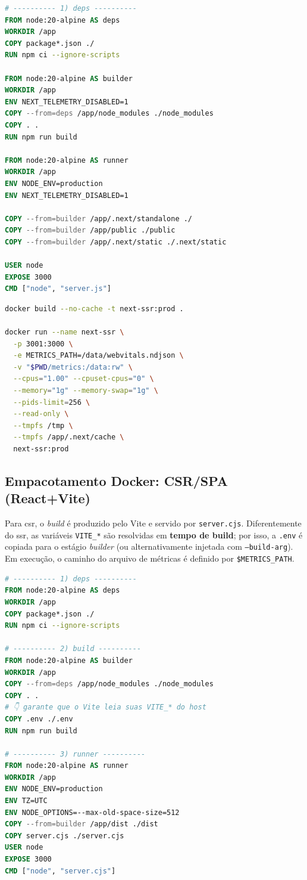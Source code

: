 \begin{lstlisting}[language=Dockerfile,caption={Dockerfile da aplicação SSR/MPA (Next.js)}]
# ---------- 1) deps ----------
FROM node:20-alpine AS deps
WORKDIR /app
COPY package*.json ./
RUN npm ci --ignore-scripts

FROM node:20-alpine AS builder
WORKDIR /app
ENV NEXT_TELEMETRY_DISABLED=1
COPY --from=deps /app/node_modules ./node_modules
COPY . .
RUN npm run build

FROM node:20-alpine AS runner
WORKDIR /app
ENV NODE_ENV=production
ENV NEXT_TELEMETRY_DISABLED=1

COPY --from=builder /app/.next/standalone ./
COPY --from=builder /app/public ./public
COPY --from=builder /app/.next/static ./.next/static

USER node
EXPOSE 3000
CMD ["node", "server.js"]
\end{lstlisting}

\begin{lstlisting}[language=bash,caption={Build e execução do container SSR com limites e volume de métricas}]
docker build --no-cache -t next-ssr:prod .

docker run --name next-ssr \
  -p 3001:3000 \
  -e METRICS_PATH=/data/webvitals.ndjson \
  -v "$PWD/metrics:/data:rw" \
  --cpus="1.00" --cpuset-cpus="0" \
  --memory="1g" --memory-swap="1g" \
  --pids-limit=256 \
  --read-only \
  --tmpfs /tmp \
  --tmpfs /app/.next/cache \
  next-ssr:prod
\end{lstlisting}

\subsection{Empacotamento Docker: CSR/SPA (React+Vite)}
\label{ssec:csr-docker}

Para \acrshort{csr}, o \textit{build} é produzido pelo Vite e servido por \texttt{server.cjs}. Diferentemente do \acrshort{ssr}, as variáveis \texttt{VITE\_*} são resolvidas em \textbf{tempo de build}; por isso, a \texttt{.env} é copiada para o estágio \textit{builder} (ou alternativamente injetada com \texttt{--build-arg}). Em execução, o caminho do arquivo de métricas é definido por \texttt{\$METRICS\_PATH}.

\begin{lstlisting}[language=Dockerfile,caption={Dockerfile da aplicação CSR/SPA (React+Vite)}]
# ---------- 1) deps ----------
FROM node:20-alpine AS deps
WORKDIR /app
COPY package*.json ./
RUN npm ci --ignore-scripts

# ---------- 2) build ----------
FROM node:20-alpine AS builder
WORKDIR /app
COPY --from=deps /app/node_modules ./node_modules
COPY . .
# 👇 garante que o Vite leia suas VITE_* do host
COPY .env ./.env
RUN npm run build

# ---------- 3) runner ----------
FROM node:20-alpine AS runner
WORKDIR /app
ENV NODE_ENV=production
ENV TZ=UTC
ENV NODE_OPTIONS=--max-old-space-size=512
COPY --from=builder /app/dist ./dist
COPY server.cjs ./server.cjs
USER node
EXPOSE 3000
CMD ["node", "server.cjs"]
\end{lstlisting}

